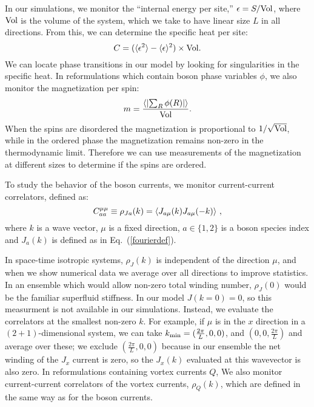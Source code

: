 In our simulations, we monitor the ``internal energy per site,'' $\epsilon= S /{\rm Vol}$, where ${\rm Vol}$ is the volume of the system, which we take to have linear size $L$ in all directions. From this, we can determine the specific heat per site:
\begin{equation}
C=(\langle \epsilon^2\rangle-\langle\epsilon\rangle^2)\times{\rm Vol}.
\end{equation}
We can locate phase transitions in our model by looking for singularities in the specific heat. In reformulations which contain boson phase variables $\phi$, we also monitor the magnetization per spin:
\begin{equation}
m = \frac{\left\langle \left|\sum_R \phi(R) \right|\right\rangle}{\rm Vol}.
\end{equation}
When the spins are disordered the magnetization is proportional to $1/\sqrt{\rm Vol}$, while in the ordered phase the magnetization remains non-zero in the thermodynamic limit. Therefore we can use measurements of the magnetization at different sizes to determine if the spins are ordered.

To study the behavior of the boson currents, we monitor current-current correlators, defined as:
\begin{equation}
C^{\mu\mu}_{aa}\equiv\rho_{Ja}({k})=\langle J_{a\mu}({k})J_{a\mu}(-{k})\rangle ~,
\label{rho}
\end{equation}
where $k$ is a wave vector, $\mu$ is a fixed direction, $a\in\{1,2\}$ is a boson species index and $J_a(k)$ is defined as in Eq.~(\ref{fourierdef}).

In space-time isotropic systems, $\rho_J({k})$ is independent of the direction $\mu$, and when we show numerical data we average over all directions to improve statistics. In an ensemble which would allow non-zero total winding number, $\rho_J(0)$ would be the familiar superfluid stiffness. In our model $J(k=0)=0$, so this measurment is not available in our simulations. Instead, we evaluate the correlators at the smallest non-zero ${k}$.  For example, if $\mu$ is in the $x$ direction in a $(2+1)$-dimensional system, we can take ${k}_{\rm min}=(\frac{2\pi}{L},0,0)$, and $(0,0,\frac{2\pi}{L})$ and average over these; we exclude $(\frac{2\pi}{L},0,0)$ because in our ensemble the net winding of the $J_x$ current is zero, so the $J_x(k)$ evaluated at this wavevector is also zero. In reformulations containing vortex currents $Q$, We also monitor current-current correlators of the vortex currents, $\rho_Q(k)$, which are defined in the same way as for the boson currents.

